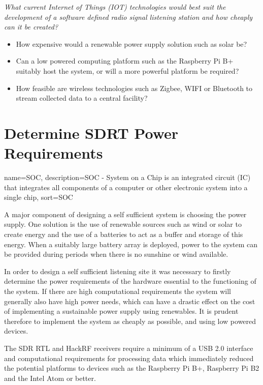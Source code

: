 \documentclass[runningheads,a4paper]{llncs}
\begin{document}
\textit{What current Internet of Things (\gls{IOT}) technologies would best suit the development of a software defined radio signal listening station and how cheaply can it be created?}

\begin{itemize}
	\item How expensive would a renewable power supply solution such as solar be?
  	\item Can a low powered computing platform such as the Raspberry Pi B+ suitably host the system, or will a more powerful platform be required?
  	\item How feasible are wireless technologies such as Zigbee, WIFI or Bluetooth to stream collected data to a central facility?
\end{itemize}


\section*{Determine SDRT Power Requirements}

{
  name={SOC},
  description={SOC - System on a Chip is an integrated circuit (IC) that integrates all components of a computer or other electronic system into a single chip},
  sort=SOC
}

A major component of designing a self sufficient system is choosing the power supply. One solution is the use of renewable sources such as wind or solar to create energy and the use of a batteries to act as a buffer and storage of this energy. When a suitably large battery array is deployed, power to the system can be provided during periods when there is no sunshine or wind available.

In order to design a self sufficient listening site it was necessary to firstly determine the power requirements of the hardware essential to the functioning of the system. If there are high computational requirements the system will generally also have high power needs, which can have a drastic effect on the cost of implementing a sustainable power supply using renewables. It is prudent therefore to implement the system as cheaply as possible, and using low powered devices.

The SDR RTL and HackRF receivers require a minimum of a USB 2.0 interface and computational requirements for processing data which immediately reduced the potential platforms to devices such as the Raspberry Pi B+, Raspberry Pi B2 and the Intel Atom or better.
\end{document}
